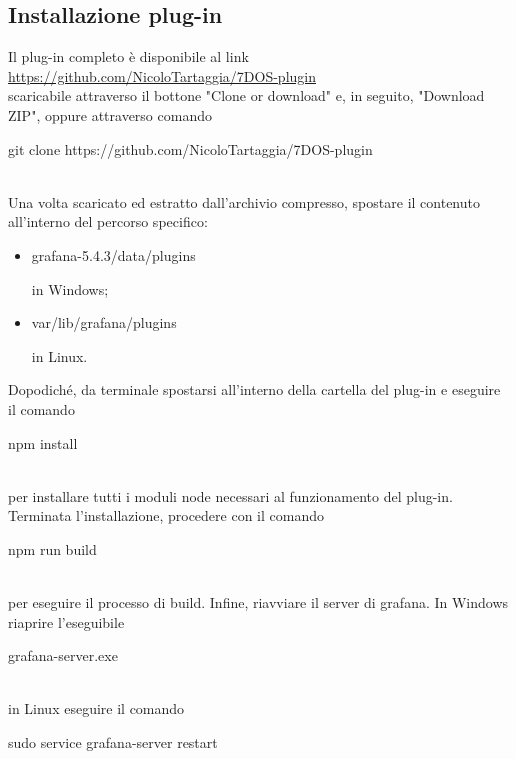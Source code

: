 \subsection{Installazione plug-in}
Il plug-in completo è disponibile al link \\[0.2cm]
\hspace*{10mm}\url{https://github.com/NicoloTartaggia/7DOS-plugin}\\[0.2cm]scaricabile attraverso il bottone "Clone or download" e, in seguito, "Download ZIP", oppure attraverso comando \\[0.2cm]
\hspace*{10mm}\begin{ttfamily}git clone https://github.com/NicoloTartaggia/7DOS-plugin\end{ttfamily}\\[0.2cm]Una volta scaricato ed estratto dall'archivio compresso, spostare il contenuto all'interno del percorso specifico: 
\begin{itemize}
	\item{\begin{ttfamily}grafana-5.4.3/data/plugins\end{ttfamily}} in Windows; \item{\begin{ttfamily}var/lib/grafana/plugins\end{ttfamily} in Linux.}
\end{itemize}
Dopodiché, da terminale spostarsi all'interno della cartella del plug-in e eseguire il comando \\[0.2cm]
\hspace*{10mm}\begin{ttfamily}npm install\end{ttfamily}\\[0.2cm] per installare tutti i moduli node necessari al funzionamento del plug-in. Terminata l'installazione, procedere con il comando \\[0.2cm]
\hspace*{10mm}\begin{ttfamily}npm run build\end{ttfamily}\\[0.2cm] per eseguire il processo di build. 
Infine, riavviare il server di grafana. In Windows riaprire l'eseguibile \\[0.2cm]
\hspace*{10mm}\begin{ttfamily}grafana-server.exe\end{ttfamily}\\[0.2cm] in Linux eseguire il comando \\[0.2cm]
\hspace*{10mm}\begin{ttfamily}sudo service grafana-server restart\end{ttfamily}


